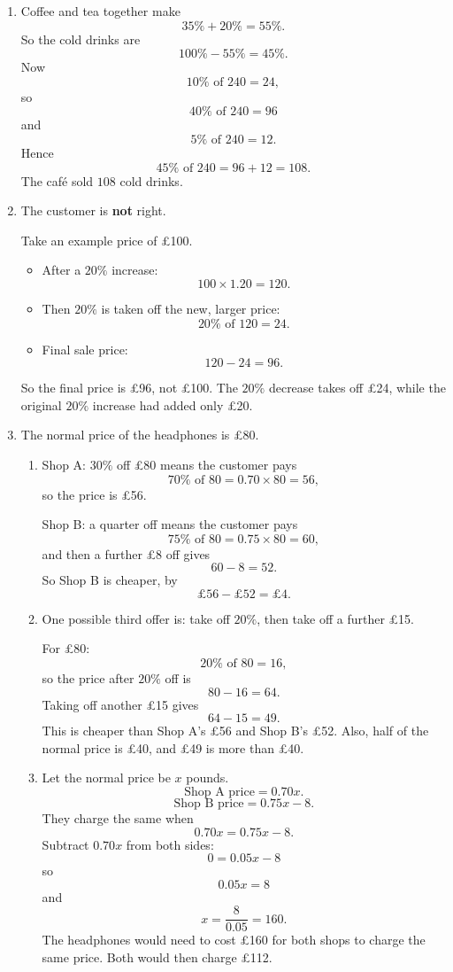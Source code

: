 \documentclass[11pt,a4paper]{article}
\begin{document}
\begin{enumerate}
\item Coffee and tea together make
\[
35\%+20\%=55\%.
\]
So the cold drinks are
\[
100\%-55\%=45\%.
\]
Now
\[
10\%\text{ of }240=24,
\]
so
\[
40\%\text{ of }240=96
\]
and
\[
5\%\text{ of }240=12.
\]
Hence
\[
45\%\text{ of }240=96+12=108.
\]
The caf\'e sold \(108\) cold drinks.

\item The customer is \textbf{not} right.

Take an example price of \pounds100.
\begin{itemize}
  \item After a \(20\%\) increase:
  \[
  100\times 1.20=120.
  \]
  \item Then \(20\%\) is taken off the new, larger price:
  \[
  20\%\text{ of }120=24.
  \]
  \item Final sale price:
  \[
  120-24=96.
  \]
\end{itemize}
So the final price is \pounds96, not \pounds100. The \(20\%\) decrease takes off \pounds24, while the original \(20\%\) increase had added only \pounds20.

\item The normal price of the headphones is \pounds80.
\begin{enumerate}
  \item Shop A: \(30\%\) off \pounds80 means the customer pays
  \[
  70\%\text{ of }80=0.70\times 80=56,
  \]
  so the price is \pounds56.

  Shop B: a quarter off means the customer pays
  \[
  75\%\text{ of }80=0.75\times 80=60,
  \]
  and then a further \pounds8 off gives
  \[
  60-8=52.
  \]
  So Shop B is cheaper, by
  \[
  \pounds56-\pounds52=\pounds4.
  \]

  \item One possible third offer is: take off \(20\%\), then take off a further \pounds15.

  For \pounds80:
  \[
  20\%\text{ of }80=16,
  \]
  so the price after \(20\%\) off is
  \[
  80-16=64.
  \]
  Taking off another \pounds15 gives
  \[
  64-15=49.
  \]
  This is cheaper than Shop A's \pounds56 and Shop B's \pounds52. Also, half of the normal price is \pounds40, and \pounds49 is more than \pounds40.

  \item Let the normal price be \(x\) pounds.
  \[
  \text{Shop A price}=0.70x.
  \]
  \[
  \text{Shop B price}=0.75x-8.
  \]
  They charge the same when
  \[
  0.70x=0.75x-8.
  \]
  Subtract \(0.70x\) from both sides:
  \[
  0=0.05x-8
  \]
  so
  \[
  0.05x=8
  \]
  and
  \[
  x=\frac{8}{0.05}=160.
  \]
  The headphones would need to cost \pounds160 for both shops to charge the same price. Both would then charge \pounds112.
\end{enumerate}

\end{enumerate}
\end{document}
